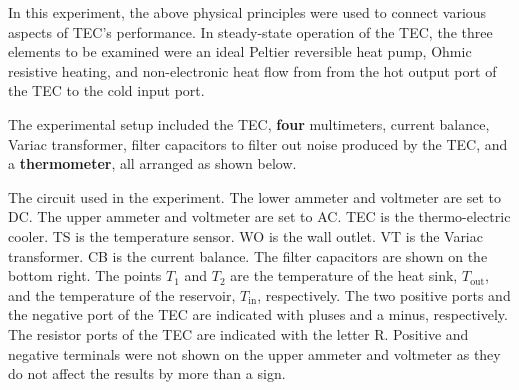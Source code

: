 \begin{paper}
	\begin{paperwhere}
	\end{paperwhere}

	In this experiment, the above physical principles were used to connect various aspects of TEC's performance. In steady-state operation of the TEC, the three elements to be examined were an ideal Peltier reversible heat pump, Ohmic resistive heating, and non-electronic heat flow from from the hot output port of the TEC to the cold input port.
	
	The experimental setup included the TEC, \textbf{four} multimeters, current balance, Variac transformer, filter capacitors to filter out noise produced by the TEC, and a \textbf{thermometer}, all arranged as shown below.
	

{}
{The circuit used in the experiment.
The lower ammeter and voltmeter are set to DC.
The upper ammeter and voltmeter are set to AC.
TEC is the thermo-electric cooler.
TS is the temperature sensor.
WO is the wall outlet.
VT is the Variac transformer.
CB is the current balance.
The filter capacitors are shown on the bottom right.
The points $T_1$ and $T_2$ are the temperature of the heat sink, $T_\text{out}$, and the temperature of the reservoir, $T_\text{in}$, respectively.
The two positive ports and the negative port of the TEC are indicated with pluses and a minus, respectively.
The resistor ports of the TEC are indicated with the letter R.
Positive and negative terminals were not shown on the upper ammeter and voltmeter as they do not affect the results by more than a sign.}
	

\end{paper}
